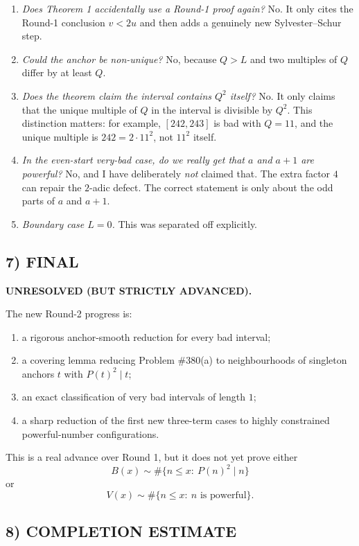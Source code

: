 \begin{enumerate}
\item \emph{Does Theorem 1 accidentally use a Round-1 proof again?} No. It only cites the Round-1 conclusion $v<2u$ and then adds a genuinely new Sylvester--Schur step.
\item \emph{Could the anchor be non-unique?} No, because $Q>L$ and two multiples of $Q$ differ by at least $Q$.
\item \emph{Does the theorem claim the interval contains $Q^2$ itself?} No. It only claims that the unique multiple of $Q$ in the interval is divisible by $Q^2$. This distinction matters: for example, $[242,243]$ is bad with $Q=11$, and the unique multiple is $242=2\cdot 11^2$, not $11^2$ itself.
\item \emph{In the even-start very-bad case, do we really get that $a$ and $a+1$ are powerful?} No, and I have deliberately \emph{not} claimed that. The extra factor $4$ can repair the $2$-adic defect. The correct statement is only about the odd parts of $a$ and $a+1$.
\item \emph{Boundary case $L=0$.} This was separated off explicitly.
\end{enumerate}

\subsection*{7) FINAL}

\textbf{UNRESOLVED (BUT STRICTLY ADVANCED).}

The new Round-2 progress is:

\begin{enumerate}
\item a rigorous anchor-smooth reduction for every bad interval;
\item a covering lemma reducing Problem \#380(a) to neighbourhoods of singleton anchors $t$ with $P(t)^2\mid t$;
\item an exact classification of very bad intervals of length $1$;
\item a sharp reduction of the first new three-term cases to highly constrained powerful-number configurations.
\end{enumerate}

This is a real advance over Round 1, but it does not yet prove either
\[
B(x)\sim \#\{n\le x:\ P(n)^2\mid n\}
\]
or
\[
V(x)\sim \#\{n\le x:\ n \mbox{ is powerful}\}.
\]

\subsection*{8) COMPLETION ESTIMATE}

